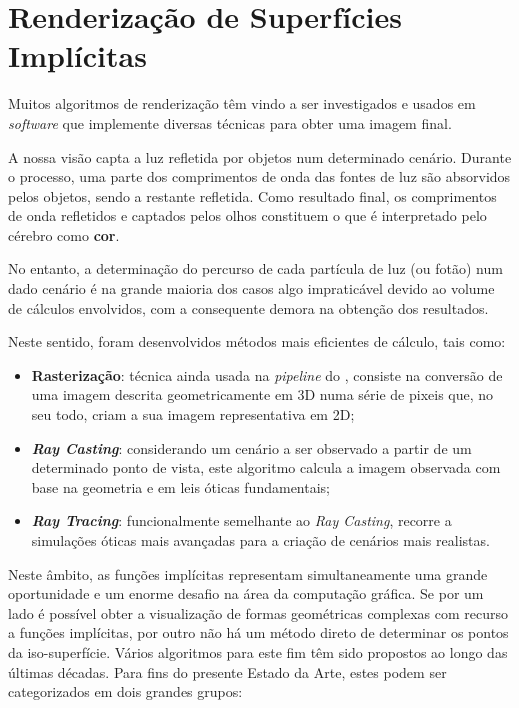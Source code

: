 \section{Renderização de Superfícies Implícitas}
\label{sec::arte:render}

Muitos algoritmos de renderização têm vindo a ser investigados e usados em \textit{software} que implemente diversas técnicas para obter uma imagem final.

A nossa visão capta a luz refletida por objetos num determinado cenário. Durante o processo, uma parte dos comprimentos de onda das fontes de luz são absorvidos pelos objetos, sendo a restante refletida. Como resultado final, os comprimentos de onda refletidos e captados pelos olhos constituem o que é interpretado pelo cérebro como \textbf{cor}.

No entanto, a determinação do percurso de cada partícula de luz (ou fotão) num dado cenário é na grande maioria dos casos algo impraticável devido ao volume de cálculos envolvidos, com a consequente demora na obtenção dos resultados.

Neste sentido, foram desenvolvidos métodos mais eficientes de cálculo, tais como:

\begin{itemize}
    \item \textbf{Rasterização}: técnica ainda usada na \textit{pipeline} do \opengl, consiste na conversão de uma imagem descrita geometricamente em 3D numa série de pixeis que, no seu todo, criam a sua imagem representativa em 2D;
    
    \item \textbf{\itshape Ray Casting}: considerando um cenário a ser observado a partir de um determinado ponto de vista, este algoritmo calcula a imagem observada com base na geometria e em leis óticas fundamentais;
    
    \item \textbf{\itshape Ray Tracing}: funcionalmente semelhante ao \textit{Ray Casting}, recorre a simulações óticas mais avançadas para a criação de cenários mais realistas.
\end{itemize}


Neste âmbito, as funções implícitas representam simultaneamente uma grande oportunidade e um enorme desafio na área da computação gráfica. Se por um lado é possível obter a visualização de formas geométricas complexas com recurso a funções implícitas, por outro não há um método direto de determinar os pontos da iso-superfície. Vários algoritmos para este fim têm sido propostos ao longo das últimas décadas. Para fins do presente Estado da Arte, estes podem ser categorizados em dois grandes grupos:

